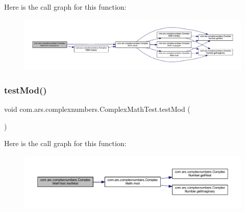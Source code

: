 Here is the call graph for this function\+:\nopagebreak
\begin{figure}[H]
\begin{center}
\leavevmode
\includegraphics[width=350pt]{classcom_1_1ars_1_1complexnumbers_1_1_complex_math_test_a2c47b64252c4ecbe00d38fe89e66a9bb_cgraph}
\end{center}
\end{figure}
\hypertarget{classcom_1_1ars_1_1complexnumbers_1_1_complex_math_test_af1b3b844bab2323d1bd4bb07712f7652}{}\label{classcom_1_1ars_1_1complexnumbers_1_1_complex_math_test_af1b3b844bab2323d1bd4bb07712f7652} 
\subsubsection{\texorpdfstring{test\+Mod()}{testMod()}}
{\footnotesize\ttfamily void com.\+ars.\+complexnumbers.\+Complex\+Math\+Test.\+test\+Mod (\begin{DoxyParamCaption}{ }\end{DoxyParamCaption})}

Here is the call graph for this function\+:\nopagebreak
\begin{figure}[H]
\begin{center}
\leavevmode
\includegraphics[width=350pt]{classcom_1_1ars_1_1complexnumbers_1_1_complex_math_test_af1b3b844bab2323d1bd4bb07712f7652_cgraph}
\end{center}
\end{figure}
\hypertarget{classcom_1_1ars_1_1complexnumbers_1_1_complex_math_test_a195e4c9c2b94ada809ff5ca462a9dc06}{}\label{classcom_1_1ars_1_1complexnumbers_1_1_complex_math_test_a195e4c9c2b94ada809ff5ca462a9dc06} 

